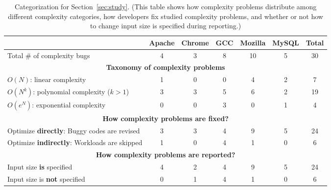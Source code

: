 \begin{table}[tb!]
\begin{adjustwidth}{-.5in}{-.5in}
\small
\centering
{
\begin{tabular}{|lcccccc|}
\hline
                                                                                  &   Apache  &   Chrome   &  GCC   &    Mozilla   &   MySQL  &  Total\\
\hline
Total \# of complexity bugs                                                       &   4       &    3       &   8    &    10        &   5      &   30 \\
\hline
\multicolumn{7}{|c|}{\bf Taxonomy of complexity problems}\\
\multicolumn{1}{|l}{{\bf $O(N)$}: linear complexity}                              &   1       &    0       &   0    &    4         &   2      &   7\\
\multicolumn{1}{|l}{{\bf $O(N^k)$}: polynomial complexity ($k>1$)}                &   3       &    3       &   5    &    6         &   2      &  19\\
\multicolumn{1}{|l}{{\bf $O(e^N)$}: exponential complexity}                       &   0       &    0       &   3    &    0         &   1      &   4\\
\hline
\multicolumn{7}{|c|}{\bf How complexity problems are fixed?}\\
\multicolumn{1}{|l}{Optimize {\bf directly}: Buggy codes are revised}              &  3        &    3       &   4    &    9         &   5      &  24 \\
\multicolumn{1}{|l}{Optimize {\bf indirectly}: Workloads are skipped}              &  1        &    0       &   4    &    1         &   0      &   6\\
\hline
\multicolumn{7}{|c|}{\bf How complexity problems are reported?}\\
\multicolumn{1}{|l}{Input size {\bf is} specified}                                &  4        &    2       &   4    &    9    &5   &24\\
\multicolumn{1}{|l}{Input size is {\bf not} specified}                            &  0        &    1       &   4    &    1    &0   &6\\
\hline
\end{tabular}
}
\end{adjustwidth}
\caption{Categorization for Section~\ref{sec:study}.
\footnotesize{(This table shows how complexity problems distribute among different complexity categories, how developers fix studied complexity problems,  
 and whether or not how to change input size is specified during reporting.)}}
\label{tab:study}
\vspace{-0.1in}
\end{table}
